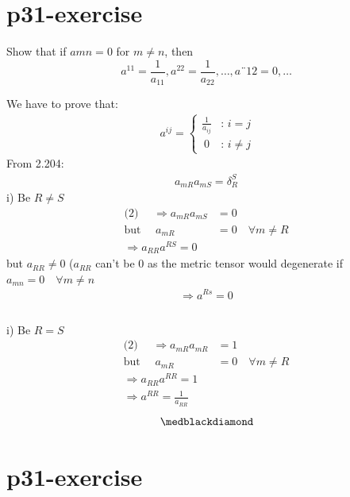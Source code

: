 \section{p31-exercise}

\begin{tcolorbox}
Show that if $a{mn} = 0$ for $m\neq n$, then $$a^{11} = \frac{1}{a_{11}}, a^{22} = \frac{1}{a_{22}}, \dots, a¨{12} = 0, \dots$$
\end{tcolorbox}
We have to prove that:
\begin{align}
\ a^{ij} = \left\{\begin{array}{cc}
\frac{1}{a_{ij}} & \text{: }i=j\\
\ 0 & \text{: }i \neq j
\end{array}\right.
\end{align}
From 2.204:
\begin{align}
a_{mR}a_{mS} = \delta^S_R
\end{align}
i) Be $R \neq S$
\begin{align}
\text{(2) }\quad \Rightarrow a_{mR}a_{mS} &= 0\\
\text{but } \quad a_{mR} &=0\quad \forall m \neq R\\
\Rightarrow a_{RR}a^{RS} = 0
\end{align}
but $a_{RR} \neq 0$ ($a_{RR}$ can't be $0$ as the metric tensor would degenerate  if $a_{mn} = 0\quad \forall m \neq n$
\begin{align}
\Rightarrow a^{Rs} = 0\\\\
\end{align}

i) Be $R = S$
\begin{align}
\text{(2) }\quad \Rightarrow a_{mR}a_{mR} &= 1\\
\text{but } \quad a_{mR} &=0\quad \forall m \neq R\\
\Rightarrow a_{RR}a^{RR} = 1\\
\Rightarrow a^{RR} = \frac{1}{a_{RR}}
\end{align}
$$\medblackdiamond$$
\newpage

\section{p31-exercise}

